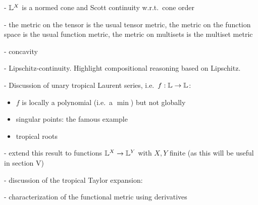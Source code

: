 - $\mathbb{L}^X$ is a normed cone and Scott continuity w.r.t.\ cone order

- the metric on the tensor is the usual tensor metric, the metric on the function space is the usual function metric, the metric on multisets is the multiset metric

- concavity

- Lipschitz-continuity. Highlight compositional reasoning based on Lipschitz.

- Discussion of unary tropical Laurent series, i.e.~$f:\mathbb{L} \to \mathbb{L}$:
\begin{itemize}

\item $f$ is locally a polynomial (i.e.~a $\min$) but not globally

\item singular points: the famous example

\item tropical roots


\end{itemize}

{\color{red}
- extend this result to functions $\mathbb{L}^{X}\to \mathbb{L}^{Y}$ with $X,Y$ finite (as this will be useful in section V)} 



- discussion of the tropical Taylor expansion: 


- characterization of the functional metric using derivatives







